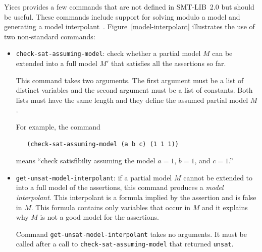 \documentclass[11pt,twoside,fleqn,openright,titlepage]{cslreport}
\begin{document}
Yices provides a few commands that are not defined in SMT-LIB~2.0 but
should be useful. These commands include support for solving modulo a
model and generating a model interpolant~\cite{jovanovic2021interpolation}.
Figure~\ref{model-interpolant} illustrates the use of two non-standard
commands:\\
\begin{itemize}
\item \texttt{check-sat-assuming-model}: check whether a partial model $M$ can be
extended into a full model $M'$ that satisfies all the assertions so far.

This command takes two arguments. The first argument must be a list of distinct variables
and the second argument must be a list of constants. Both lists must have the same length
and they define the assumed partial model $M$.

For example, the command
\begin{footnotesize}
\begin{verbatim}
   (check-sat-assuming-model (a b c) (1 1 1))
\end{verbatim}
\end{footnotesize}
means ``check satisfibiliy assuming the model $a=1$, $b=1$, and $c=1$.''

\item \texttt{get-unsat-model-interpolant}: if a partial model $M$
  cannot be extended to into a full model of the assertions, this
  command produces a \emph{model interpolant\/}. This interpolant is a
  formula implied by the assertion and is false in $M$. This formula
  contains only variables that occur in $M$ and it explains why $M$ is
  not a good model for the assertions.

  Command \texttt{get-unsat-model-interpolant} takes no arguments. It must be called after a call to
  \texttt{check-sat-assuming-model} that returned \texttt{unsat}.
\end{itemize}
\end{document}
